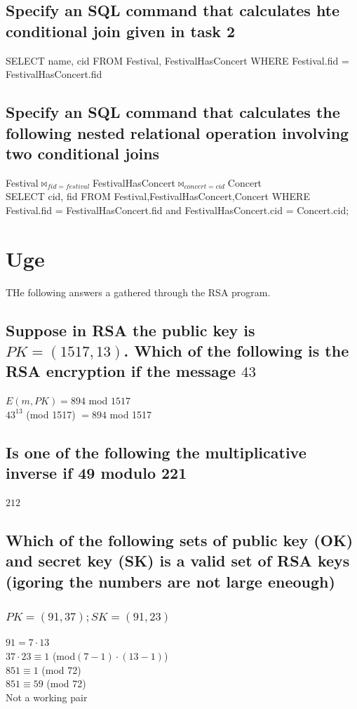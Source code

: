\documentclass[12pt, a4paper]{article}
\begin{document}
	\subsection{Specify an SQL command that calculates hte conditional join given in task 2}
	SELECT name, cid FROM Festival, FestivalHasConcert WHERE Festival.fid = FestivalHasConcert.fid
	\subsection{Specify an SQL command that calculates the following nested relational operation involving two conditional joins}
	Festival$\bowtie_{fid=festival}$FestivalHasConcert$\bowtie_{concert=cid}$Concert\\
	SELECT cid, fid FROM Festival,FestivalHasConcert,Concert WHERE Festival.fid = FestivalHasConcert.fid and FestivalHasConcert.cid = Concert.cid;
\section{Uge}
	THe following answers a gathered through the RSA program.
	\subsection{Suppose in RSA the public key is $PK=(1517,13)$. Which of the following is the RSA encryption if the message $43$}
		$E(m,PK)=894$ mod $1517$\\
		$43^{13} $ (mod 1517) $=894$ mod 1517\\
	\subsection{Is one of the following the multiplicative inverse if 49 modulo 221}
		$212$
	\subsection{Which of the following sets of public key (OK) and secret key (SK) is a valid set of RSA keys (igoring the numbers are not large eneough)}
		\subsubsection{$PK=(91,37);SK=(91,23)$}
			$91=7\cdot 13$\\
			$37\cdot 23\equiv 1$ (mod$(7-1)\cdot (13-1)$)\\
			$851\equiv 1$ (mod 72)\\
			$851\equiv 59$ (mod 72)\\
			Not a working pair
\end{document}
